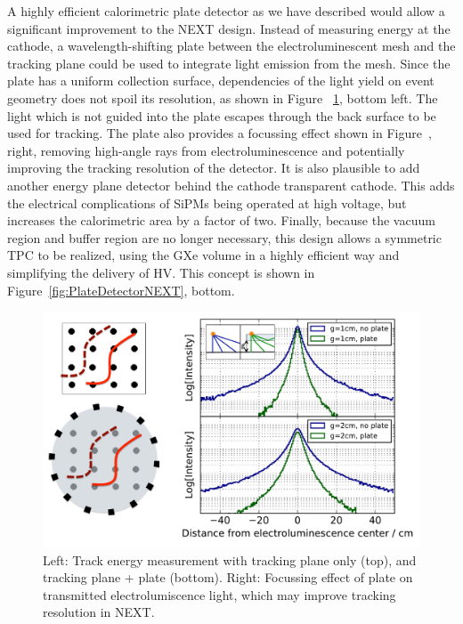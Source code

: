 A highly efficient calorimetric plate detector as we have described would allow a significant improvement to the NEXT design.  Instead of measuring energy at the cathode, a wavelength-shifting plate between the electroluminescent mesh and the tracking plane could be used to integrate light emission from the mesh. Since the plate has a uniform collection surface,  dependencies of the light yield on event geometry does not spoil its resolution, as shown in Figure~ \ref{fig:TrackingEffect}, bottom left.  The light which is not guided into the plate escapes through the back surface to be used for tracking.  The plate also provides a focussing effect shown in Figure~\label{fig:TrackingEffect}, right, removing high-angle rays from electroluminescence and potentially improving the tracking resolution of the detector.  It is also plausible to add another energy plane detector behind the cathode transparent cathode. This adds the electrical complications of  SiPMs being operated at high voltage, but increases the calorimetric area by a factor of two.  Finally, because the vacuum region and buffer region are no longer necessary, this design allows a symmetric TPC to be realized, using the GXe volume in a highly efficient way and simplifying the delivery of HV.  This concept is shown in Figure~\ref{fig:PlateDetectorNEXT}, bottom.




\begin{figure}[t!]
\begin{centering}

\includegraphics[width=0.85\columnwidth]{./images/FocussingEffectAndTrackShape.pdf}
\par\end{centering}

\caption{Left: Track energy measurement with tracking plane only (top), and tracking plane + plate (bottom).  Right: Focussing effect of plate on transmitted electrolumiscence light, which may improve tracking resolution in NEXT. \label{fig:TrackingEffect}}

\end{figure}

